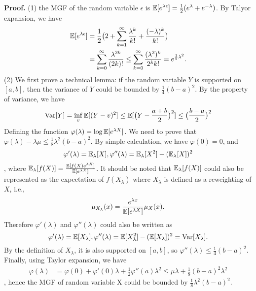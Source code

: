 \noindent \textbf{Proof.} (1) the MGF of the random variable $\epsilon$ is ${\mathbb{E}}[e^{\lambda\epsilon}]=\frac{1}{2} (e^\lambda + e^{-\lambda})$. By Talyor expansion, we have
\begin{align*}
    {\mathbb{E}}[e^{\lambda\epsilon}]&=\frac{1}{2} \big(2 + \sum_{k=1}^\infty \frac{\lambda^k}{k!}+\frac{(-\lambda)^k}{k!}\big)\\
    &= \sum_{k=0}^\infty \frac{\lambda^{2k}}{(2k)!} \le  \sum_{k=0}^\infty \frac{(\lambda^2)^k}{2^k k!}=e^{\frac{1}{2}\lambda^2}. 
\end{align*}
(2) We first prove a technical lemma: if the random variable $Y$ is supported on $[a,b]$, then the variance of $Y$ could be bounded by $\frac{1}{4}(b-a)^2$. By the property of variance, we have
\begin{equation*}
    {\mathrm{Var}}[Y]=\inf_{v} {\mathbb{E}}[(Y-v)^2] \le {\mathbb{E}}[\big(Y-\frac{a+b}{2}\big)^2]\le \big(\frac{b-a}{2}\big)^2
\end{equation*}
Defining the function $\varphi(\lambda)=\log {\mathbb{E}}[e^{\lambda X}]$. We need to prove that $\varphi(\lambda)-\lambda\mu \le \frac{1}{8}\lambda^2(b-a)^2$. By simple calculation, we have $\varphi(0)=0$, and 
\begin{equation*}
\varphi'(\lambda)={\mathbb{E}}_\lambda[X], \varphi''(\lambda)={\mathbb{E}}_\lambda[X^2]-({\mathbb{E}}_\lambda[X])^2
\end{equation*}, where ${\mathbb{E}}_{\lambda}[f(X)]=\frac{{\mathbb{E}}[f(X) e^{\lambda X}]}{{\mathbb{E}}[e^{\lambda X}]}$. It should be noted that ${\mathbb{E}}_{\lambda}[f(X)]$ could also be represented as the expectation of $f(X_\lambda)$ where $X_\lambda$ is defined as a reweighting of $X$, i.e.,
\begin{equation*}
    \mu_{X_\lambda}(x) = \frac{e^{\lambda x}}{{\mathbb{E}}[e^{\lambda X}]} \mu_X(x).
\end{equation*}Therefore $\varphi'(\lambda)$ and $\varphi''(\lambda)$ could also be written as
\begin{equation*}
\varphi'(\lambda)={\mathbb{E}}[X_\lambda], \varphi''(\lambda)={\mathbb{E}}[X_\lambda^2]-({\mathbb{E}}[X_\lambda])^2={\mathrm{Var}}[X_\lambda].
\end{equation*} By the definition of $X_\lambda$, it is also supported on $[a,b]$, so $\varphi''(\lambda)\le \frac{1}{4}(b-a)^2$. Finally, using Taylor expansion, we have\begin{align*}
    \varphi(\lambda)&=\varphi(0)+\varphi'(0)\lambda+\frac{1}{2}\varphi''(a)\lambda^2 \le \mu\lambda + \frac{1}{8}(b-a)^2\lambda^2
\end{align*}, hence the MGF of random variable X could be bounded by $\frac{1}{8}\lambda^2(b-a)^2$.

